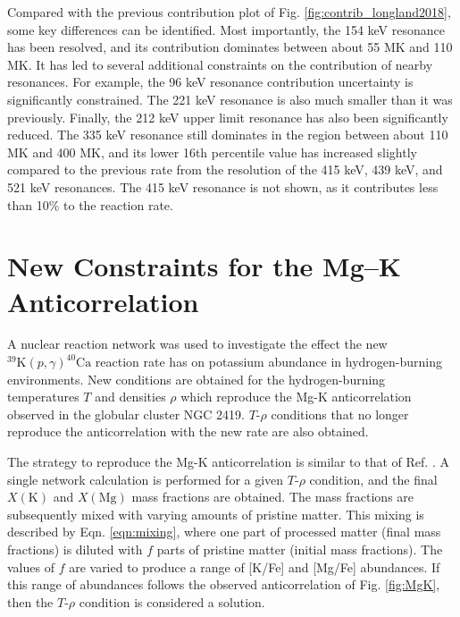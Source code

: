 Compared with the previous contribution plot of Fig. \ref{fig:contrib_longland2018}, some key differences can be identified. Most importantly, the 154 keV resonance has been resolved, and its contribution dominates between about 55 MK and 110 MK. It has led to several additional constraints on the contribution of nearby resonances. For example, the 96 keV resonance contribution uncertainty is significantly constrained. The 221 keV resonance is also much smaller than it was previously. Finally, the 212 keV upper limit resonance has also been significantly reduced. The 335 keV resonance still dominates in the region between about 110 MK and 400 MK, and its lower 16th percentile value has increased slightly compared to the previous rate from the resolution of the 415 keV, 439 keV, and 521 keV resonances. The 415 keV resonance is not shown, as it contributes less than 10$\%$ to the reaction rate.

\section{New Constraints for the Mg--K Anticorrelation} \label{sec:potassium_network}

A nuclear reaction network was used to investigate the effect the new $^{39}\mathrm{K}(p,\gamma)^{40}\mathrm{Ca}$ reaction rate has on potassium abundance in hydrogen-burning environments. New conditions are obtained for the hydrogen-burning temperatures $T$ and densities $\rho$ which reproduce the Mg-K anticorrelation observed in the globular cluster NGC 2419. $T$-$\rho$ conditions that no longer reproduce the anticorrelation with the new rate are also obtained. 

The strategy to reproduce the Mg-K anticorrelation is similar to that of Ref. \cite{Iliadis2016}. A single network calculation is performed for a given $T$-$\rho$ condition, and the final $X(\mathrm{K})$ and $X(\mathrm{Mg})$ mass fractions are obtained. The mass fractions are subsequently mixed with varying amounts of pristine matter. This mixing is described by Eqn. \ref{eqn:mixing}, where one part of processed matter (final mass fractions) is diluted with $f$ parts of pristine matter (initial mass fractions). The values of $f$ are varied to produce a range of [K/Fe] and [Mg/Fe] abundances. If this range of abundances follows the observed anticorrelation of Fig. \ref{fig:MgK}, then the $T$-$\rho$ condition is considered a solution.

